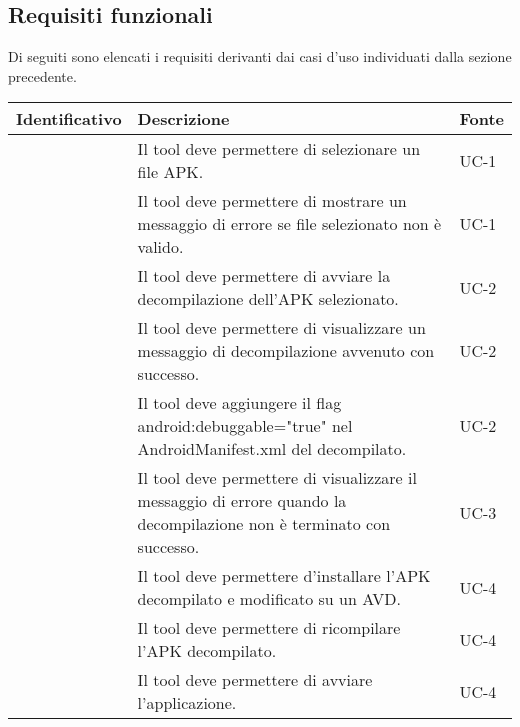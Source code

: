 \subsection{Requisiti funzionali}\label{subsec:requisiti-funzionali}
Di seguiti sono elencati i requisiti derivanti dai casi d'uso individuati dalla sezione precedente.
\begin{longtable}{ | c| C{7cm} |C{3cm} |}
    \hline
    \textbf{Identificativo} & \textbf{Descrizione}                                                                                                  & \textbf{Fonte} \\\hline
           & Il tool deve permettere di selezionare un file APK.                                                                   & UC-1           \\\hline
        & Il tool deve permettere di mostrare un messaggio di errore se file selezionato non è valido.                          & UC-1           \\\hline
    \setcounter{subCount}{0}

           & Il tool deve permettere di avviare la decompilazione dell'APK selezionato.                                            & UC-2           \\\hline
        & Il tool deve permettere di visualizzare un messaggio di decompilazione avvenuto con successo.                         & UC-2           \\\hline
        & Il tool deve aggiungere il flag android:debuggable="true" nel AndroidManifest.xml del decompilato.                    & UC-2           \\\hline
    \setcounter{subCount}{0}

           & Il tool deve permettere di visualizzare il messaggio di errore quando la decompilazione non è terminato con successo. & UC-3           \\\hline
           & Il tool deve permettere d'installare l'APK decompilato e modificato su un AVD.                                         & UC-4           \\\hline
        & Il tool deve permettere di ricompilare l'APK decompilato.                                                             & UC-4           \\\hline
        & Il tool deve permettere di avviare l'applicazione.                                                                    & UC-4           \\\hline


\end{longtable}
